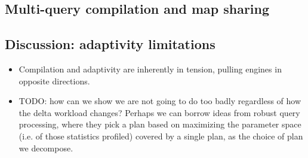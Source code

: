 \subsection{Multi-query compilation and map sharing}

\subsection{Discussion: adaptivity limitations}

\begin{itemize}
  \item Compilation and adaptivity are inherently in tension, pulling engines
  in opposite directions.
  \item TODO: how can we show we are not going to do too badly regardless of how
  the delta workload changes? Perhaps we can borrow ideas from robust query
  processing, where they pick a plan based on maximizing the parameter space
  (i.e. of those statistics profiled) covered by a single plan, as the choice of
  plan we decompose.
\end{itemize}